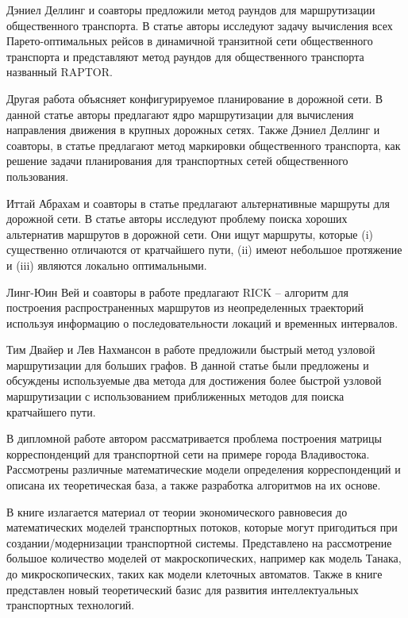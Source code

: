 Дэниел Деллинг и соавторы предложили метод раундов для маршрутизации общественного транспорта. В статье 
\cite{delling2014round} авторы исследуют задачу вычисления всех Парето-оптимальных рейсов в динамичной 
транзитной сети общественного транспорта и представляют метод раундов для общественного транспорта 
названный RAPTOR.

Другая работа \cite{delling2015customizable} объясняет конфигурируемое планирование в дорожной сети. В 
данной статье авторы предлагают ядро маршрутизации для вычисления направления движения в крупных дорожных 
сетях. Также Дэниел Деллинг и соавторы, в статье \cite{delling2015public} предлагают метод маркировки 
общественного транспорта, как решение задачи планирования для транспортных сетей общественного 
пользования.

Иттай Абрахам и соавторы в статье \cite{abraham2013alternative} предлагают альтернативные маршруты для 
дорожной сети. В статье авторы исследуют проблему поиска хороших альтернатив маршрутов в дорожной сети. 
Они ищут маршруты, которые (i) существенно отличаются от кратчайшего пути, (ii) имеют небольшое протяжение 
и (iii) являются локально оптимальными.

Линг-Юин Вей и соавторы в работе \cite{wei2012constructing} предлагают RICK -- алгоритм для построения 
распространенных маршрутов из неопределенных траекторий используя информацию о последовательности локаций
и временных интервалов.

Тим Двайер и Лев Нахмансон в работе \cite{dwyer2009fast} предложили быстрый метод узловой маршрутизации 
для больших графов. В данной статье были предложены и обсуждены используемые два метода для достижения 
более быстрой узловой маршрутизации с использованием приближенных методов для поиска кратчайшего пути.

В дипломной работе \cite{bib:22} автором рассматривается проблема построения матрицы корреспонденций для 
транспортной сети на примере города Владивостока. Рассмотрены различные математические модели определения 
корреспонденций и описана их теоретическая база, а также разработка алгоритмов на их основе.

В книге \cite{bib:23} излагается материал от теории экономического равновесия до математических моделей 
транспортных потоков, которые могут пригодиться при создании/модернизации транспортной системы. Представлено 
на рассмотрение большое количество моделей от макроскопических, например как модель Танака, до 
микроскопических, таких как модели клеточных автоматов. Также в книге представлен новый теоретический базис 
для развития интеллектуальных транспортных технологий.


